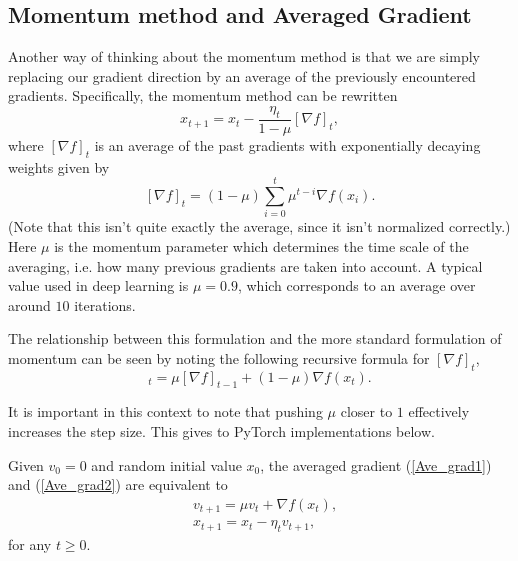 \subsection{Momentum method and Averaged Gradient} 

Another way of thinking about the momentum method is that we are simply replacing our gradient direction by an average of the previously encountered gradients. Specifically, the momentum method can be rewritten
\begin{equation}\label{Ave_grad1}
x_{t+1} = x_t - \frac{\eta_t}{1-\mu}[\nabla f]_t,
\end{equation}
where $[\nabla f]_t$ is an average of the past gradients with exponentially decaying weights given by
\begin{equation}\label{Ave_grad2}
[\nabla f]_t= (1-\mu)\sum_{i=0}^t \mu^{t-i} \nabla f(x_i).
\end{equation}
(Note that this isn't quite exactly the average, since it isn't normalized correctly.)
Here $\mu$ is the momentum parameter which determines the time scale of the averaging, i.e. how many previous gradients are taken into account. A typical value used in deep learning is $\mu = 0.9$, which corresponds to an average over around $10$ iterations.

The relationship between this formulation and the more standard formulation of momentum can be seen by noting the following recursive formula for $[\nabla f]_t$,
\begin{equation}
[\nabla f]_t = \mu[\nabla f]_{t-1} + (1-\mu)\nabla f(x_t).
\end{equation}

It is important in this context to note that pushing $\mu$ closer to $1$ effectively increases the step size. This gives to PyTorch implementations below.

\begin{theorem}
	Given $v_0=0$ and random initial value $x_0$, the averaged gradient (\ref{Ave_grad1}) and (\ref{Ave_grad2}) are equivalent to 
	\begin{align}
	&v_{t+1} = \mu v_t + \nabla f(x_t),\\
	&x_{t+1} = x_{t} - \eta_t v_{t+1},
	\end{align}
	for any $t\geq 0$.
\end{theorem}


